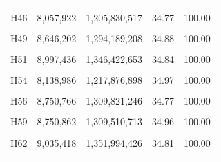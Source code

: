 \documentclass[
  a4paper,
  titlepage]{article}
\begin{document}
\begin{longtable}[t]{lllll}
\cellcolor{gray!6}{H45} & \cellcolor{gray!6}{9,431,222} & \cellcolor{gray!6}{1,411,404,726} & \cellcolor{gray!6}{34.86} & \cellcolor{gray!6}{100.00}\\
 
H46 & 8,057,922 & 1,205,830,517 & 34.77 & 100.00\\
 
\cellcolor{gray!6}{H47} & \cellcolor{gray!6}{9,243,218} & \cellcolor{gray!6}{1,383,432,588} & \cellcolor{gray!6}{34.79} & \cellcolor{gray!6}{100.00}\\
 
H49 & 8,646,202 & 1,294,189,208 & 34.88 & 100.00\\
 
\cellcolor{gray!6}{H50} & \cellcolor{gray!6}{9,207,260} & \cellcolor{gray!6}{1,378,169,004} & \cellcolor{gray!6}{34.25} & \cellcolor{gray!6}{100.00}\\
 
H51 & 8,997,436 & 1,346,422,653 & 34.84 & 100.00\\
 
\cellcolor{gray!6}{H52} & \cellcolor{gray!6}{9,969,242} & \cellcolor{gray!6}{1,492,113,419} & \cellcolor{gray!6}{34.59} & \cellcolor{gray!6}{100.00}\\
 
H54 & 8,138,986 & 1,217,876,898 & 34.97 & 100.00\\
 
\cellcolor{gray!6}{H55} & \cellcolor{gray!6}{11,371,662} & \cellcolor{gray!6}{1,701,967,034} & \cellcolor{gray!6}{34.94} & \cellcolor{gray!6}{100.00}\\
 
H56 & 8,750,766 & 1,309,821,246 & 34.77 & 100.00\\
 
\cellcolor{gray!6}{H58} & \cellcolor{gray!6}{7,936,232} & \cellcolor{gray!6}{1,187,674,751} & \cellcolor{gray!6}{34.58} & \cellcolor{gray!6}{100.00}\\
 
H59 & 8,750,862 & 1,309,510,713 & 34.96 & 100.00\\
 
\cellcolor{gray!6}{H61} & \cellcolor{gray!6}{7,699,294} & \cellcolor{gray!6}{1,152,128,433} & \cellcolor{gray!6}{34.88} & \cellcolor{gray!6}{100.00}\\
 
H62 & 9,035,418 & 1,351,994,426 & 34.81 & 100.00\\
 
\cellcolor{gray!6}{H63} & \cellcolor{gray!6}{9,692,740} & \cellcolor{gray!6}{1,450,861,561} & \cellcolor{gray!6}{34.64} & \cellcolor{gray!6}{100.00}\\
 

\end{longtable}
\end{document}
